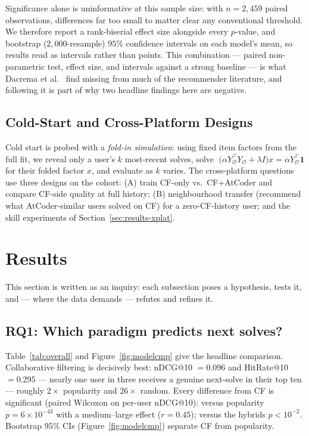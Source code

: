 \documentclass[12pt,a4paper]{article}
\newcommand{\ndcg}{nDCG}
\begin{document}
Significance alone is uninformative at this sample size: with $n=2{,}459$ paired
observations, differences far too small to matter clear any conventional threshold.
We therefore report a rank-biserial effect size alongside every $p$-value, and bootstrap
($2{,}000$-resample) $95\%$ confidence intervals on each model's mean, so results read as
intervals rather than points. This combination --- paired non-parametric test, effect size, and intervals against a
strong baseline --- is what Dacrema et al.~\cite{dacrema2019} find missing from much of
the recommender literature, and following it is part of why two headline findings here
are negative.

\subsection{Cold-Start and Cross-Platform Designs}
Cold start is probed with a \emph{fold-in simulation}: using fixed item factors from the
full fit, we reveal only a user's $k$ most-recent solves, solve
$\;\big(\alpha Y_{\mathcal{O}}^\top Y_{\mathcal{O}} + \lambda I\big)x = \alpha Y_{\mathcal{O}}^\top\mathbf{1}$
for their folded factor $x$, and evaluate as $k$ varies. The cross-platform questions use
three designs on the cohort: (A) train CF-only vs.\ CF+AtCoder and compare CF-side quality
at full history; (B) neighbourhood transfer (recommend what AtCoder-similar users solved
on CF) for a zero-CF-history user; and the skill experiments of
Section~\ref{sec:results-xplat}.

\section[Results \textnormal{\small(1,185 words)}]{Results}
\label{sec:results}
This section is written as an inquiry: each subsection poses a hypothesis, tests it, and
--- where the data demands --- refutes and refines it.

\subsection{RQ1: Which paradigm predicts next solves?}
Table~\ref{tab:overall} and Figure~\ref{fig:modelcmp} give the headline comparison.
Collaborative filtering is decisively best: \ndcg{}@10 $=0.096$ and HitRate@10 $=0.295$
--- nearly one user in three receives a genuine next-solve in their top ten --- roughly
$2\times$ popularity and $26\times$ random. Every difference from CF is significant (paired
Wilcoxon on per-user \ndcg{}@10): versus popularity $p=6\times10^{-43}$ with a
medium--large effect ($r=0.45$); versus the hybrids $p<10^{-2}$. Bootstrap $95\%$ CIs
(Figure~\ref{fig:modelcmp}) separate CF from popularity.
\end{document}
